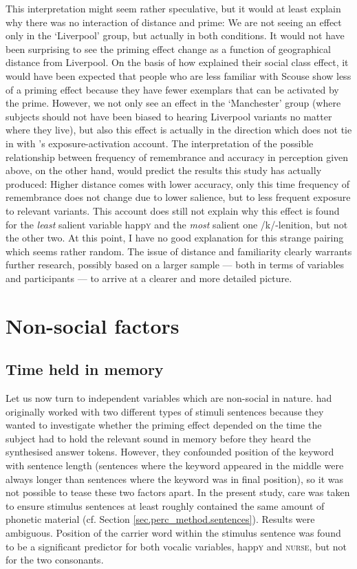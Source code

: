 This interpretation might seem rather speculative, but it would at least explain why there was no interaction of distance and prime: We are not seeing an effect only in the `Liverpool' group, but actually in both conditions.
It would not have been surprising to see the priming effect change as a function of geographical distance from Liverpool.
On the basis of how \textcite{haydrager2010} explained their social class effect, it would have been expected that people who are less familiar with Scouse show less of a priming effect because they have fewer exemplars that can be activated by the prime.
However, we not only see an effect in the `Manchester' group (where subjects should not have been biased to hearing Liverpool variants no matter where they live), but also this effect is actually in the direction which does not tie in with \citeauthor{haydrager2010}'s exposure-activation account.
The interpretation of the possible relationship between frequency of remembrance and accuracy in perception given above, on the other hand, would predict the results this study has actually produced: Higher distance comes with lower accuracy, only this time frequency of remembrance does not change due to lower salience, but to less frequent exposure to relevant variants.
This account does still not explain why this effect is found for the \emph{least} salient variable happ\textsc{y} and the \emph{most} salient one /k/-lenition, but not the other two.
At this point, I have no good explanation for this strange pairing which seems rather random.
The issue of distance and familiarity clearly warrants further research, possibly based on a larger sample --- both in terms of variables and participants --- to arrive at a clearer and more detailed picture.

	\section{Non-social factors}
		\label{sec.perc_res.disc.nonsocial}

		\subsection{Time held in memory}

Let us now turn to independent variables which are non-social in nature.
\textcite{hayetal2006a} had originally worked with two different types of stimuli sentences because they wanted to investigate whether the priming effect depended on the time the subject had to hold the relevant sound in memory before they heard the synthesised answer tokens.
However, they confounded position of the keyword with sentence length (sentences where the keyword appeared in the middle were always longer than sentences where the keyword was in final position), so it was not possible to tease these two factors apart.
In the present study, care was taken to ensure stimulus sentences at least roughly contained the same amount of phonetic material (cf. Section \ref{sec.perc_method.sentences}).
Results were ambiguous.
Position of the carrier word within the stimulus sentence was found to be a significant predictor for both vocalic variables, happ\textsc{y} and \textsc{nurse}, but not for the two consonants.

